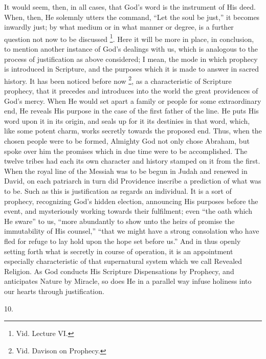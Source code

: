 It would seem, then, in all cases, that God's word is the
instrument of His deed. When, then, He solemnly utters the command,
``Let the soul be just,'' it becomes inwardly just; by what
medium or in what manner or degree, is a further question not now to
be discussed \footnote{Vid. Lecture
VI.}. Here it
will be more in place, in conclusion, to mention another instance of
God's dealings with us, which is analogous to the process of
justification as above considered; I mean, the mode in which prophecy
is introduced in Scripture, and the purposes which it is made to
answer in sacred history. It has been noticed before now \footnote{Vid. Davison on
Prophecy.}, as a characteristic of Scripture prophecy, that it precedes
and introduces into the world the great providences of God's mercy.
When He would set apart a family or people for some extraordinary end,
He reveals His purpose in the case of the first father of the line. He
puts His word upon it in its origin, and seals up for it its destinies
in that word, which, like some potent charm, works secretly towards
the proposed end. Thus, when the chosen people were to be formed,
Almighty God not only chose Abraham, but spoke over him the promises
which in due time were to be accomplished. The twelve tribes had each
its own character and history stamped on it from the first. When the
royal line of the Messiah was to be begun in Judah and renewed in
David, on each patriarch in turn did Providence inscribe a prediction
of what was to be. Such as this is justification as regards an
individual. It is a sort of prophecy, recognizing God's hidden
election, announcing His purposes before the event, and mysteriously
working towards their fulfilment; even ``the oath which He sware''
to us, ``more abundantly to show unto the heirs of promise the
immutability of His counsel,'' ``that we might have a strong
consolation who have fled for refuge to lay hold upon the hope set
before us.'' And in thus openly setting forth what is secretly in
course of operation, it is an appointment especially characteristic of
that supernatural system which we call Revealed Religion. As God
conducts His Scripture Dispensations by Prophecy, and anticipates
Nature by Miracle, so does He in a parallel way infuse holiness into
our hearts through justification.

10.

